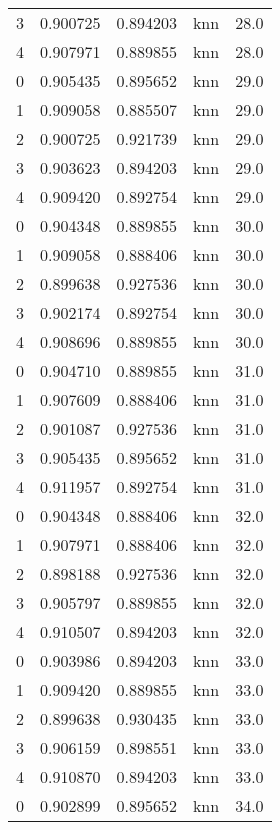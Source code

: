 \begin{tabular}{rrrlr}
     3 & 0.900725 & 0.894203 &      knn &       28.0 \\
     4 & 0.907971 & 0.889855 &      knn &       28.0 \\
     0 & 0.905435 & 0.895652 &      knn &       29.0 \\
     1 & 0.909058 & 0.885507 &      knn &       29.0 \\
     2 & 0.900725 & 0.921739 &      knn &       29.0 \\
     3 & 0.903623 & 0.894203 &      knn &       29.0 \\
     4 & 0.909420 & 0.892754 &      knn &       29.0 \\
     0 & 0.904348 & 0.889855 &      knn &       30.0 \\
     1 & 0.909058 & 0.888406 &      knn &       30.0 \\
     2 & 0.899638 & 0.927536 &      knn &       30.0 \\
     3 & 0.902174 & 0.892754 &      knn &       30.0 \\
     4 & 0.908696 & 0.889855 &      knn &       30.0 \\
     0 & 0.904710 & 0.889855 &      knn &       31.0 \\
     1 & 0.907609 & 0.888406 &      knn &       31.0 \\
     2 & 0.901087 & 0.927536 &      knn &       31.0 \\
     3 & 0.905435 & 0.895652 &      knn &       31.0 \\
     4 & 0.911957 & 0.892754 &      knn &       31.0 \\
     0 & 0.904348 & 0.888406 &      knn &       32.0 \\
     1 & 0.907971 & 0.888406 &      knn &       32.0 \\
     2 & 0.898188 & 0.927536 &      knn &       32.0 \\
     3 & 0.905797 & 0.889855 &      knn &       32.0 \\
     4 & 0.910507 & 0.894203 &      knn &       32.0 \\
     0 & 0.903986 & 0.894203 &      knn &       33.0 \\
     1 & 0.909420 & 0.889855 &      knn &       33.0 \\
     2 & 0.899638 & 0.930435 &      knn &       33.0 \\
     3 & 0.906159 & 0.898551 &      knn &       33.0 \\
     4 & 0.910870 & 0.894203 &      knn &       33.0 \\
     0 & 0.902899 & 0.895652 &      knn &       34.0 \\

\end{tabular}
